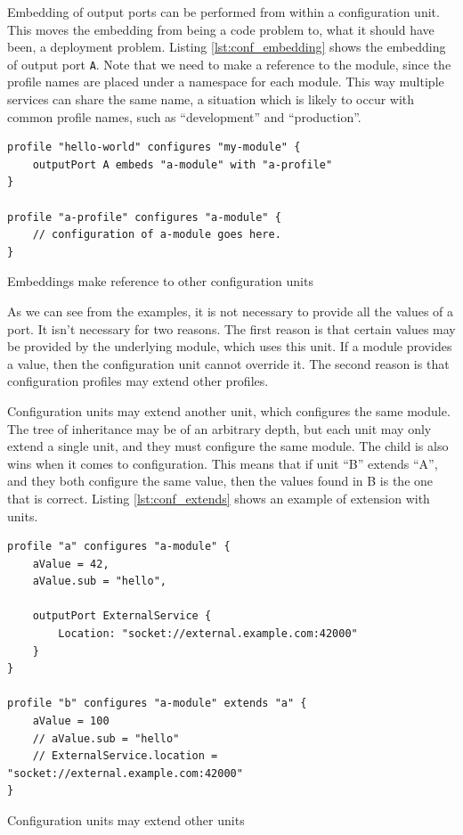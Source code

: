 Embedding of output ports can be performed from within a configuration unit.
This moves the embedding from being a code problem to, what it should have
been, a deployment problem. Listing \ref{lst:conf_embedding} shows the
embedding of output port \texttt{A}. Note that we need to make a
reference to the module, since the profile names are placed under a namespace
for each module. This way multiple services can share the same name, a
situation which is likely to occur with common profile names, such as
``development'' and ``production''.

\begin{listing}[H]
\begin{verbatim}
profile "hello-world" configures "my-module" {
    outputPort A embeds "a-module" with "a-profile"
}

profile "a-profile" configures "a-module" {
    // configuration of a-module goes here.
}
\end{verbatim}
\caption{Embeddings make reference to other configuration units}
\label{lst:conf_embedding}
\end{listing}

As we can see from the examples, it is not necessary to provide all the values
of a port. It isn't necessary for two reasons. The first reason is that certain
values may be provided by the underlying module, which uses this unit. If a
module provides a value, then the configuration unit cannot override it. The
second reason is that configuration profiles may extend other profiles.

Configuration units may extend another unit, which configures the same module.
The tree of inheritance may be of an arbitrary depth, but each unit may only
extend a single unit, and they must configure the same module. The child is
also wins when it comes to configuration. This means that if unit ``B'' extends
``A'', and they both configure the same value, then the values found in B is
the one that is correct. Listing \ref{lst:conf_extends} shows an example of
extension with units.

\begin{listing}[H]
\begin{verbatim}
profile "a" configures "a-module" {
    aValue = 42,
    aValue.sub = "hello",

    outputPort ExternalService {
        Location: "socket://external.example.com:42000"
    }
}

profile "b" configures "a-module" extends "a" {
    aValue = 100
    // aValue.sub = "hello"
    // ExternalService.location = "socket://external.example.com:42000"
}
\end{verbatim}
\caption{Configuration units may extend other units}
\label{lst:conf_extends}
\end{listing}

